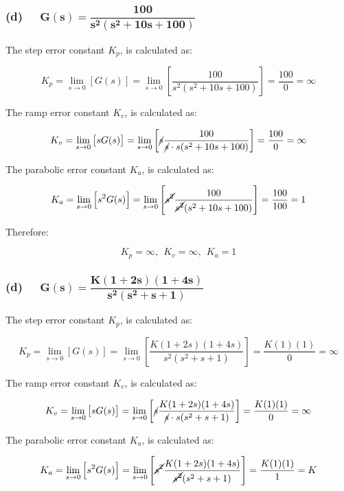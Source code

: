 \documentclass[12pt, letterpaper]{../assignment}
\begin{document}
\subsubsection*{(d) \ \  $ \mathbf{ G(s) = \dfrac{100}{s^2 (s^2 + 10 s + 100)}}$}

The step error constant $K_p$, is calculated as:

$$ K_p = \lim_{s \to 0} \left[ G(s) \right]
       = \lim_{s \to 0} \left[ \frac{100}{s^2 (s^2 + 10 s + 100)} \right]
       = \frac{100}{0}
       = \infty $$

The ramp error constant $K_v$, is calculated as:

$$ K_v = \lim_{s \to 0} \left[ s G(s) \right]
        = \lim_{s \to 0} \left[ \cancel{s} \frac{100}{\cancel{s} \cdot s (s^2 + 10 s + 100)} \right]
        = \frac{100}{0}
        = \infty $$

The parabolic error constant $K_a$, is calculated as:

$$ K_a = \lim_{s \to 0} \left[ s^2 G(s) \right]
        = \lim_{s \to 0} \left[ \cancel{s^2} \frac{100}{\cancel{s^2} (s^2 + 10 s + 100)} \right]
        = \frac{100}{100}
        = 1 $$

Therefore:

\begin{answer}
    $$ K_p = \infty, \ \ K_v = \infty, \ \ K_a = 1  $$
\end{answer}

\subsubsection*{(d) \ \  $ \mathbf{ G(s) = \dfrac{K(1 + 2s)(1 +4s)}{s^2(s^2 + s + 1)}}$}

The step error constant $K_p$, is calculated as:

$$ K_p = \lim_{s \to 0} \left[ G(s) \right]
       = \lim_{s \to 0} \left[ \frac{K(1 + 2s)(1 +4s)}{s^2(s^2 + s + 1)} \right]
       = \frac{K (1) (1)}{0}
       = \infty $$

The ramp error constant $K_v$, is calculated as:

$$ K_v = \lim_{s \to 0} \left[ s G(s) \right]
        = \lim_{s \to 0} \left[ \cancel{s} \frac{K(1 + 2s)(1 +4s)}{\cancel{s} \cdot s (s^2 + s + 1)} \right]
        = \frac{K(1)(1)}{0}
        = \infty $$

The parabolic error constant $K_a$, is calculated as:

$$ K_a = \lim_{s \to 0} \left[ s^2 G(s) \right]
        = \lim_{s \to 0} \left[ \cancel{s^2} \frac{K(1 + 2s)(1 +4s)}{\cancel{s^2}(s^2 + s + 1)} \right]
        = \frac{K(1)(1)}{1}
        = K $$
\end{document}
